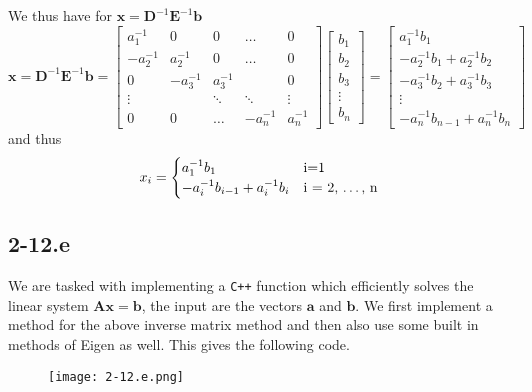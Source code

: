 \documentclass{article}
\begin{document}
\noindent We thus have for $\mathbf{x} = \mathbf{D}^{-1}\mathbf{E}^{-1}\mathbf{b}$
\begin{equation*}
    \mathbf{x} = \mathbf{D}^{-1}\mathbf{E}^{-1}\mathbf{b} = \begin{bmatrix}
        a_{1}^{-1} & 0 & 0 & \dots& 0 \\
        -a_{2}^{-1} & a_{2}^{-1} & 0 &\dots & 0 \\
        0 & -a_{3}^{-1} & a_{3}^{-1} &  & 0 \\
        \vdots &  & \ddots & \ddots & \vdots \\
        0 & 0 & \dots & -a_{n}^{-1} & a_{n}^{-1}
    \end{bmatrix} \begin{bmatrix}
        b_{1} \\ b_{2} \\ b_{3} \\ \vdots \\ b_{n}
    \end{bmatrix} = \begin{bmatrix}
        a_{1}^{-1}b_{1} \\
        -a_{2}^{-1}b_{1} +a_{2}^{-1}b_{2} \\
        -a_{3}^{-1}b_{2} + a_{3}^{-1}b_{3} \\
        \vdots \\
        -a_{n}^{-1}b_{n-1} + a_{n}^{-1}b_{n}
    \end{bmatrix}
\end{equation*}
and thus
\begin{equation*}
    x_{i} = 
    \begin{cases}
    a_{1}^{-1}b_{1} \quad &\text{i=1} \\
    -a_{i}^{-1}b_{i-1} + a_{i}^{-1}b_{i} &\text{i = 2, \dots, n}
    \end{cases}
\end{equation*}
\subsection*{2-12.e}
We are tasked with implementing a \verb|C++| function which efficiently solves the linear system $\mathbf{A}\mathbf{x}=\mathbf{b}$, the input are the vectors $\mathbf{a}$ and $\mathbf{b}$. We first implement a method for the above inverse matrix method and then also use some built in methods of Eigen as well. This gives the following code.
\begin{figure}[!hbt]
    \centering
\texttt{[image: 2-12.e.png]}
\end{figure}
\end{document}
